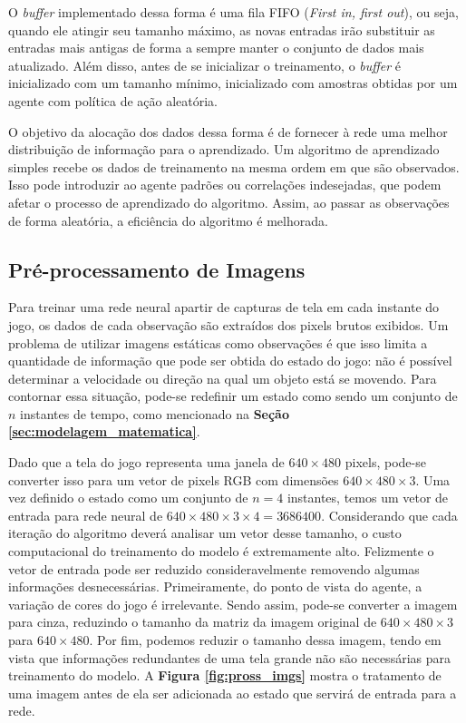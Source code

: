 O \textit{buffer} implementado dessa forma é uma fila FIFO (\textit{First in, first out}), ou seja, quando ele atingir seu tamanho máximo, as novas entradas irão substituir as entradas mais antigas de forma a sempre manter o conjunto de dados mais atualizado. Além disso, antes de se inicializar o treinamento, o \textit{buffer} é inicializado com um tamanho mínimo, inicializado com amostras obtidas por um agente com política de ação aleatória.

O objetivo da alocação dos dados dessa forma é de fornecer à rede uma melhor distribuição de informação para o aprendizado. Um algoritmo de aprendizado simples recebe os dados de treinamento na mesma ordem em que são observados. Isso pode introduzir ao agente padrões ou correlações indesejadas, que podem afetar o processo de aprendizado do algoritmo. Assim, ao passar as observações de forma aleatória, a eficiência do algoritmo é melhorada. 




\subsection{Pré-processamento de Imagens} %
\label{sub:preprocessamento}

Para treinar uma rede neural apartir de capturas de tela em cada instante do jogo, os dados de cada observação são extraídos dos pixels brutos exibidos. Um problema de utilizar imagens estáticas como observações é que isso limita a quantidade de informação que pode ser obtida do estado do jogo: não é possível determinar a velocidade ou direção na qual um objeto está se movendo. Para contornar essa situação, pode-se redefinir um estado como sendo um conjunto de $n$ instantes de tempo, como mencionado na \textbf{Seção \ref{sec:modelagem_matematica}}. 

Dado que a tela do jogo representa uma janela de $640\times480$ pixels, pode-se converter isso para um vetor de pixels RGB com dimensões $640\times480\times3$. Uma vez definido o estado como um conjunto de $n=4$ instantes, temos um vetor de entrada para rede neural de $640\times480\times3\times4=3686400$. Considerando que cada iteração do algoritmo deverá analisar um vetor desse tamanho, o custo computacional do treinamento do modelo é extremamente alto. Felizmente o vetor de entrada pode ser reduzido consideravelmente removendo algumas informações desnecessárias. Primeiramente, do ponto de vista do agente, a variação de cores do jogo é irrelevante. Sendo assim, pode-se converter a imagem para cinza, reduzindo o tamanho da matriz da imagem original de $640\times480\times3$ para $640\times480$. Por fim, podemos reduzir o tamanho dessa imagem, tendo em vista que informações redundantes de uma tela grande não são necessárias para treinamento do modelo. A \textbf{Figura \ref{fig:pross_imgs}} mostra o tratamento de uma imagem antes de ela ser adicionada ao estado que servirá de entrada para a rede.

